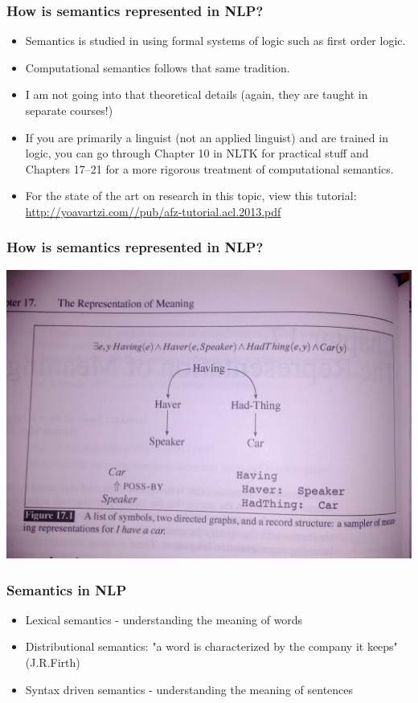 \documentclass{beamer}
\begin{document}
\begin{frame}
\frametitle{How is semantics represented in NLP?}
\begin{itemize}
\item Semantics is studied in using formal systems of logic such as first order logic.
\item Computational semantics follows that same tradition.
\item I am not going into that theoretical details (again, they are taught in separate courses!)
\item If you are primarily a linguist (not an applied linguist) and are trained in logic, you can go through Chapter 10 in NLTK for practical stuff and Chapters 17--21 for a more rigorous treatment of computational semantics. 
\item For the state of the art on research in this topic, view this tutorial: \url{http://yoavartzi.com//pub/afz-tutorial.acl.2013.pdf}
\end{itemize}
\end{frame}

\begin{frame}
\frametitle{How is semantics represented in NLP?}
\includegraphics[width=\textwidth]{semantics.jpg}
\end{frame}

\begin{frame}
\frametitle{Semantics in NLP}
\begin{itemize}
\item Lexical semantics - understanding the meaning of words
\item Distributional semantics: "a word is characterized by the company it keeps" (J.R.Firth)
\item Syntax driven semantics - understanding the meaning of sentences
\end{itemize}
\end{frame}
\end{document}
